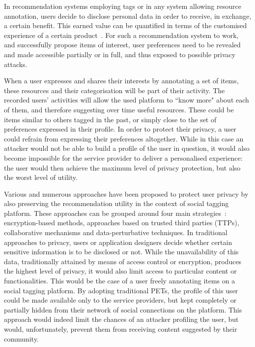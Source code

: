 In recommendation systems employing tags or in any system allowing resource annotation, users decide to disclose personal data in order to receive, in exchange, a certain benefit. This earned value can be quantified in terms of the customised experience of a certain product~\cite{a01}. For such a recommendation system to work, and successfully propose items of interest, user preferences need to be revealed and made accessible partially or in full, and thus exposed to possible privacy attacks.

When a user expresses and shares their interests by annotating a set of items, these resources and their categorisation will be part of their activity. The recorded users' activities will allow the used platform to ``know more" about each of them, and therefore suggesting over time useful resources. These could be items similar to others tagged in the past, or simply close to the set of preferences expressed in their profile. In order to protect their privacy, a user could refrain from expressing their preferences altogether. While in this case an attacker would not be able to build a profile of the user in question, it would also become impossible for the service provider to deliver a personalised experience: the user would then achieve the maximum level of privacy protection, but also the worst level of utility.

Various and numerous approaches have been proposed to protect user privacy by also preserving the recommendation utility in the context of social tagging platform. These approaches can be grouped around four main strategies~\cite{Shen07SIGIR}: encryption-based methods, approaches based on trusted third parties (TTPs), collaborative mechanisms and data-perturbative techniques. In traditional approaches to privacy, users or application designers decide whether certain sensitive information is to be disclosed or not. While the unavailability of this data, traditionally attained by means of access control or encryption, produces the highest level of privacy, it would also limit access to particular content or functionalities. This would be the case of a user freely annotating items on a social tagging platform. By adopting traditional PETs, the profile of this user could be made available only to the service providers, but kept completely or partially hidden from their network of social connections on the platform. This approach would indeed limit the chances of an attacker profiling the user, but would, unfortunately, prevent them from receiving content suggested by their community.

